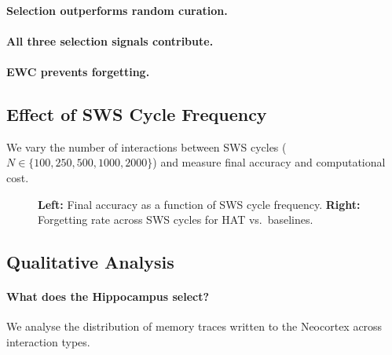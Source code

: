 \paragraph{Selection outperforms random curation.}

\paragraph{All three selection signals contribute.}

\paragraph{EWC prevents forgetting.}

\subsection{Effect of SWS Cycle Frequency}
\label{sec:analysis:frequency}

We vary the number of interactions between SWS cycles ($N \in \{100, 250, 500, 1000, 2000\}$) and measure final accuracy and computational cost.

\begin{figure}[t]
  \centering
  \hfill
  \caption{\textbf{Left:} Final accuracy as a function of SWS cycle frequency.  \textbf{Right:} Forgetting rate across SWS cycles for HAT vs.\ baselines.}
  \label{fig:sws_frequency}
\end{figure}


\subsection{Qualitative Analysis}
\label{sec:analysis:qualitative}

\paragraph{What does the Hippocampus select?}
We analyse the distribution of memory traces written to the Neocortex across interaction types.

